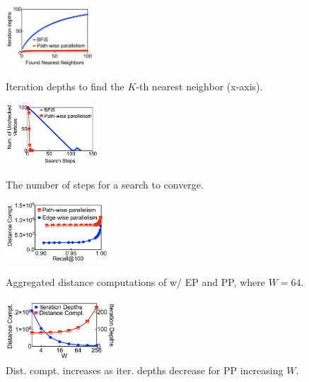 \begin{figure}[t]
    \begin{minipage}[t]{0.23\textwidth}
        \centering
        \includegraphics[height=0.9in]{submissions/Minjia2023/figures/insight_last_update_iter_vs_rank}
        \caption{Iteration depths to find the $K$-th nearest neighbor (x-axis).}
        \label{minjia_fig:insight_convergence_steps_Top_M_vs_SGS}
    \end{minipage}
    \hfill
    \begin{minipage}[t]{0.23\textwidth}
        \centering
        \includegraphics[height=0.9in]{submissions/Minjia2023/figures/insight_unchecked_vs_iters}
        \caption{The number of steps for a search to converge.}
        \label{minjia_subfig:insight_unchecked_vs_iters}
    \end{minipage}
        \hfill
    \begin{minipage}[t]{0.23\textwidth}
        \centering
        \includegraphics[height=0.90in]{submissions/Minjia2023/figures/insight_1T_compt_Top_M_vs_SGS}
        \caption{
            {Aggregated distance computations of \SeqShortName w/ EP and PP, where $W = 64$.}}
        \label{minjia_fig:insight_1T_compt_Top_M_vs_SGS}
    \end{minipage}
    \hfill
    \begin{minipage}[t]{0.23\textwidth}
        \centering
        \includegraphics[height=0.90in]{submissions/Minjia2023/figures/insight_Top_M_compt_steps_vs_M}
        \caption{
            Dist. compt. increases as iter. depths decrease for PP increasing $W$.}
        \label{minjia_fig:insight_Top_M_compt_steps_vs_M}
    \end{minipage}
\end{figure}


